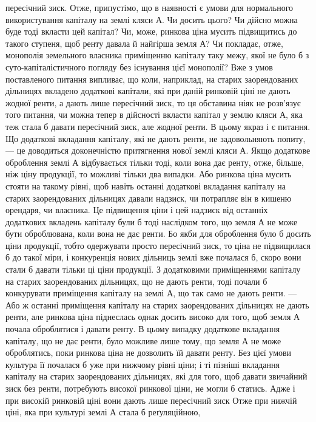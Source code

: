 пересічний зиск. Отже, припустімо, що в наявності є умови для нормального
використування капіталу на землі кляси А. Чи досить цього? Чи дійсно можна
буде тоді вкласти цей капітал? Чи, може, ринкова ціна мусить підвищитись
до такого ступеня, щоб ренту давала й найгірша земля А? Чи покладає, отже,
монополія земельного власника приміщенню капіталу таку межу, якої не було б
з суто-капіталістичного погляду без існування цієї монополії? Вже з умов поставленого
питання випливає, що коли, наприклад, на старих заорендованих
дільницях вкладено додаткові капітали, які при даній ринковій ціні не дають
жодної ренти, а дають лише пересічний зиск, то ця обставина ніяк не розв'язує
того питання, чи можна тепер в дійсності вкласти капітал у землю кляси А,
яка теж стала б давати пересічний зиск, але жодної ренти. В цьому якраз і є
питання. Що додаткові вкладання капіталу, які не дають ренти, не задовольняють
попиту, — це доводиться доконечністю притягнення нової землі кляси А. Якщо
додаткове оброблення землі А відбувається тільки тоді, коли вона дає ренту,
отже, більше, ніж ціну продукції, то можливі тільки два випадки. Або ринкова
ціна мусить стояти на такому рівні, щоб навіть останні додаткові вкладання
капіталу на старих заорендованих дільницях давали надзиск, чи потрапляє він
в кишеню орендаря, чи власника. Це підвищення ціни і цей надзиск від останніх
додаткових вкладень капіталу були б тоді наслідком того, що земля А не може
бути оброблювана, коли вона не дає ренти. Бо якби для оброблення було б
досить ціни продукції, тобто одержувати просто пересічний зиск, то ціна не
підвищилася б до такої міри, і конкуренція нових дільниць землі вже почалася
б, скоро вони стали б давати тільки ці ціни продукції. З додатковими
приміщеннями капіталу на старих заорендованих дільницях, що не дають ренти,
тоді почали б конкурувати приміщення капіталу на землі А, що так само не
дають ренти. — Або ж останні приміщення капіталу на старих заорендованих
дільницях не дають ренти, але ринкова ціна піднеслась однак досить високо
для того, щоб земля А почала оброблятися і давати ренту. В цьому випадку
додаткове вкладання капіталу, що не дає ренти, було можливе лише тому, що
земля А не може оброблятись, поки ринкова ціна не дозволить їй давати ренту.
Без цієї умови культура її почалася б уже при нижчому рівні ціни; і ті пізніші
вкладання капіталу на старих заорендованих дільницях, які для того,
щоб давати звичайний зиск без ренти, потребують високої ринкової ціни, не
могли б статись. Адже і при високій ринковій ціні вони дають лише пересічний
зиск Отже при нижчій ціні, яка при культурі землі А стала б реґуляційною,
